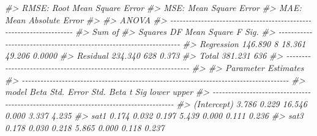 \documentclass[
]{article}
\newenvironment{Shaded}{\begin{snugshade}}{\end{snugshade}}
\newcommand{\CommentTok}[1]{\textcolor[rgb]{0.56,0.35,0.01}{\textit{#1}}}
\begin{document}
\begin{Shaded}
\begin{Highlighting}[]
\CommentTok{\#\textgreater{}  RMSE: Root Mean Square Error }
\CommentTok{\#\textgreater{}  MSE: Mean Square Error }
\CommentTok{\#\textgreater{}  MAE: Mean Absolute Error }
\CommentTok{\#\textgreater{} }
\CommentTok{\#\textgreater{}                                ANOVA                                 }
\CommentTok{\#\textgreater{} {-}{-}{-}{-}{-}{-}{-}{-}{-}{-}{-}{-}{-}{-}{-}{-}{-}{-}{-}{-}{-}{-}{-}{-}{-}{-}{-}{-}{-}{-}{-}{-}{-}{-}{-}{-}{-}{-}{-}{-}{-}{-}{-}{-}{-}{-}{-}{-}{-}{-}{-}{-}{-}{-}{-}{-}{-}{-}{-}{-}{-}{-}{-}{-}{-}{-}{-}{-}}
\CommentTok{\#\textgreater{}                Sum of                                               }
\CommentTok{\#\textgreater{}               Squares         DF    Mean Square      F         Sig. }
\CommentTok{\#\textgreater{} {-}{-}{-}{-}{-}{-}{-}{-}{-}{-}{-}{-}{-}{-}{-}{-}{-}{-}{-}{-}{-}{-}{-}{-}{-}{-}{-}{-}{-}{-}{-}{-}{-}{-}{-}{-}{-}{-}{-}{-}{-}{-}{-}{-}{-}{-}{-}{-}{-}{-}{-}{-}{-}{-}{-}{-}{-}{-}{-}{-}{-}{-}{-}{-}{-}{-}{-}{-}}
\CommentTok{\#\textgreater{} Regression    146.890          8         18.361    49.206    0.0000 }
\CommentTok{\#\textgreater{} Residual      234.340        628          0.373                     }
\CommentTok{\#\textgreater{} Total         381.231        636                                    }
\CommentTok{\#\textgreater{} {-}{-}{-}{-}{-}{-}{-}{-}{-}{-}{-}{-}{-}{-}{-}{-}{-}{-}{-}{-}{-}{-}{-}{-}{-}{-}{-}{-}{-}{-}{-}{-}{-}{-}{-}{-}{-}{-}{-}{-}{-}{-}{-}{-}{-}{-}{-}{-}{-}{-}{-}{-}{-}{-}{-}{-}{-}{-}{-}{-}{-}{-}{-}{-}{-}{-}{-}{-}}
\CommentTok{\#\textgreater{} }
\CommentTok{\#\textgreater{}                                   Parameter Estimates                                   }
\CommentTok{\#\textgreater{} {-}{-}{-}{-}{-}{-}{-}{-}{-}{-}{-}{-}{-}{-}{-}{-}{-}{-}{-}{-}{-}{-}{-}{-}{-}{-}{-}{-}{-}{-}{-}{-}{-}{-}{-}{-}{-}{-}{-}{-}{-}{-}{-}{-}{-}{-}{-}{-}{-}{-}{-}{-}{-}{-}{-}{-}{-}{-}{-}{-}{-}{-}{-}{-}{-}{-}{-}{-}{-}{-}{-}{-}{-}{-}{-}{-}{-}{-}{-}{-}{-}{-}{-}{-}{-}{-}{-}}
\CommentTok{\#\textgreater{}       model      Beta    Std. Error    Std. Beta      t        Sig      lower    upper }
\CommentTok{\#\textgreater{} {-}{-}{-}{-}{-}{-}{-}{-}{-}{-}{-}{-}{-}{-}{-}{-}{-}{-}{-}{-}{-}{-}{-}{-}{-}{-}{-}{-}{-}{-}{-}{-}{-}{-}{-}{-}{-}{-}{-}{-}{-}{-}{-}{-}{-}{-}{-}{-}{-}{-}{-}{-}{-}{-}{-}{-}{-}{-}{-}{-}{-}{-}{-}{-}{-}{-}{-}{-}{-}{-}{-}{-}{-}{-}{-}{-}{-}{-}{-}{-}{-}{-}{-}{-}{-}{-}{-}}
\CommentTok{\#\textgreater{} (Intercept)     3.786         0.229                 16.546    0.000     3.337    4.235 }
\CommentTok{\#\textgreater{}        sat1     0.174         0.032        0.197     5.439    0.000     0.111    0.236 }
\CommentTok{\#\textgreater{}        sat3     0.178         0.030        0.218     5.865    0.000     0.118    0.237 }

\end{Highlighting}
\end{Shaded}
\end{document}
